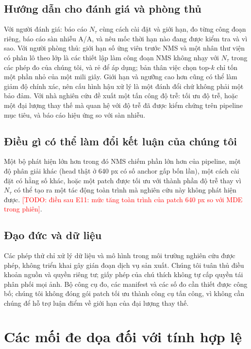 \documentclass[a4paper,fleqn]{cas-dc}
\newcommand{\todo}[1]{\textcolor{red}{[TODO: #1]}}
\newcommand{\Ntau}{N_{\tau}}
\begin{document}
\subsection{Hướng dẫn cho đánh giá và phòng thủ}
Với người đánh giá: báo cáo $\Ntau$ cùng cách cài đặt và giới hạn, đo từng công đoạn riêng, báo cáo sàn nhiễu A/A, và nêu mốc thời hạn nào đang được kiểm tra và vì sao. Với người phòng thủ: giới hạn số ứng viên trước NMS và một nhân thư viện có phân lô theo lớp là các thiết lập làm công đoạn NMS không nhạy với $\Ntau$ trong các phép đo của chúng tôi, và rẻ để áp dụng; bản thân việc chọn top-$k$ chỉ tốn một phần nhỏ của một mili giây. Giới hạn và ngưỡng cao hơn cũng có thể làm giảm độ chính xác, nên cấu hình hậu xử lý là một đánh đổi chứ không phải một bảo đảm. Với nhà nghiên cứu đề xuất một tấn công độ trễ: tối ưu độ trễ, hoặc một đại lượng thay thế mà quan hệ với độ trễ đã được kiểm chứng trên pipeline mục tiêu, và báo cáo hiệu ứng so với sàn nhiễu.

\subsection{Điều gì có thể làm đổi kết luận của chúng tôi}
Một bộ phát hiện lớn hơn trong đó NMS chiếm phần lớn hơn của pipeline, một độ phân giải khác (head thật ở 640 px có số anchor gấp bốn lần), một cách cài đặt có hằng số khác, hoặc một patch được tối ưu với thành phần độ trễ thay vì $\Ntau$ có thể tạo ra một tác động toàn trình mà nghiên cứu này không phát hiện được. \todo{điền sau E11: mức tăng toàn trình của patch 640 px so với MDE trong phiên}.

\subsection{Đạo đức và dữ liệu}
Các phép thử chỉ xử lý dữ liệu và mô hình trong môi trường nghiên cứu được phép, không triển khai gây gián đoạn dịch vụ sản xuất. Chúng tôi tuân thủ điều khoản nguồn và quyền riêng tư; giấy phép của chú thích không tự cấp quyền tái phân phối mọi ảnh. Bộ công cụ đo, các manifest và các số đo cần thiết được công bố; chúng tôi không đóng gói patch tối ưu thành công cụ tấn công, vì không cần chúng để hỗ trợ luận điểm về giới hạn của đại lượng thay thế.

\section{Các mối đe dọa đối với tính hợp lệ}
\label{sec:threats}
\end{document}
